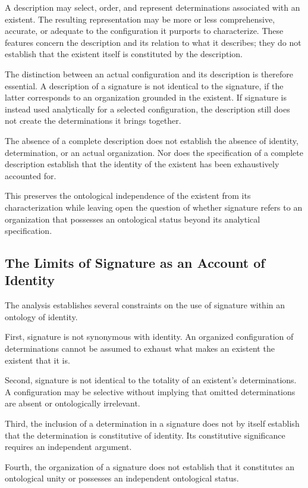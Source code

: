 A description may select, order, and represent
determinations associated with an existent. The
resulting representation may be more or less
comprehensive, accurate, or adequate to the
configuration it purports to characterize. These
features concern the description and its relation
to what it describes; they do not establish that
the existent itself is constituted by the
description.

The distinction between an actual configuration
and its description is therefore essential.
A description of a signature is not identical
to the signature, if the latter corresponds to
an organization grounded in the existent. If
signature is instead used analytically for a
selected configuration, the description still
does not create the determinations it brings
together.

The absence of a complete description does not
establish the absence of identity, determination,
or an actual organization. Nor does the
specification of a complete description establish
that the identity of the existent has been
exhaustively accounted for.

This preserves the ontological independence
of the existent from its characterization while
leaving open the question of whether signature
refers to an organization that possesses an
ontological status beyond its analytical
specification.

\subsection{The Limits of Signature as an Account of Identity}

The analysis establishes several constraints
on the use of signature within an ontology
of identity.

First, signature is not synonymous with identity.
An organized configuration of determinations
cannot be assumed to exhaust what makes an
existent the existent that it is.

Second, signature is not identical to the totality
of an existent's determinations. A configuration
may be selective without implying that omitted
determinations are absent or ontologically
irrelevant.

Third, the inclusion of a determination in a
signature does not by itself establish that
the determination is constitutive of identity.
Its constitutive significance requires an
independent argument.

Fourth, the organization of a signature does
not establish that it constitutes an ontological
unity or possesses an independent ontological
status.

